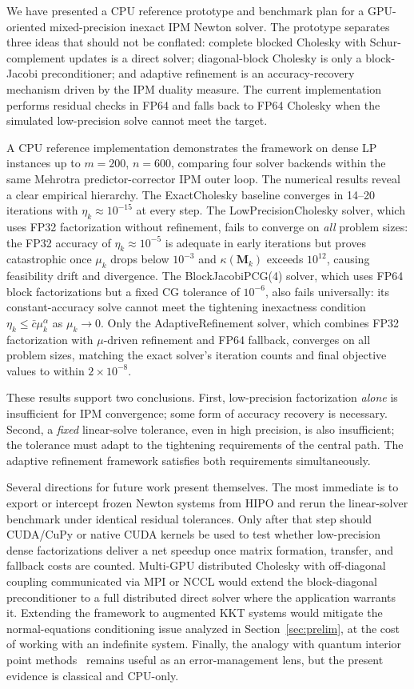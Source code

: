 \documentclass[11pt,twoside]{article}
\newcommand{\bM}{\mathbf{M}}
\begin{document}
We have presented a CPU reference prototype and benchmark plan for a
GPU-oriented mixed-precision inexact IPM Newton solver.  The prototype
separates three ideas that should not be conflated: complete blocked
Cholesky with Schur-complement updates is a direct solver; diagonal-block
Cholesky is only a block-Jacobi preconditioner; and adaptive refinement is
an accuracy-recovery mechanism driven by the IPM duality measure.  The
current implementation performs residual checks in FP64 and falls back to
FP64 Cholesky when the simulated low-precision solve cannot meet the
target.

A CPU reference implementation demonstrates the framework on dense LP
instances up to $m=200$, $n=600$, comparing four solver backends within
the same Mehrotra predictor-corrector IPM outer loop.  The numerical
results reveal a clear empirical hierarchy.  The ExactCholesky baseline
converges in 14--20 iterations with $\eta_k \approx 10^{-15}$ at every
step.  The LowPrecisionCholesky solver, which uses FP32 factorization
without refinement, fails to converge on \emph{all} problem sizes: the
FP32 accuracy of $\eta_k \approx 10^{-5}$ is adequate in early iterations
but proves catastrophic once $\mu_k$ drops below $10^{-3}$ and
$\kappa(\bM_k)$ exceeds $10^{12}$, causing feasibility drift and
divergence.  The BlockJacobiPCG(4) solver, which uses FP64 block
factorizations but a fixed CG tolerance of $10^{-6}$, also fails
universally: its constant-accuracy solve cannot meet the tightening
inexactness condition $\eta_k \le \bar{c}\mu_k^\alpha$ as $\mu_k \to 0$.
Only the AdaptiveRefinement solver, which combines FP32 factorization
with $\mu$-driven refinement and FP64 fallback, converges on all problem
sizes, matching the exact solver's iteration counts and final objective
values to within $2\times 10^{-8}$.

These results support two conclusions.  First, low-precision
factorization \emph{alone} is insufficient for IPM convergence; some form
of accuracy recovery is necessary.  Second, a \emph{fixed} linear-solve
tolerance, even in high precision, is also insufficient; the tolerance
must adapt to the tightening requirements of the central path.  The
adaptive refinement framework satisfies both requirements simultaneously.

Several directions for future work present themselves.  The most immediate
is to export or intercept frozen Newton systems from HIPO and rerun the
linear-solver benchmark under identical residual tolerances.  Only after
that step should CUDA/CuPy or native CUDA kernels be used to test whether
low-precision dense factorizations deliver a net speedup once matrix
formation, transfer, and fallback costs are counted.  Multi-GPU
distributed Cholesky with off-diagonal coupling communicated via MPI or
NCCL would extend the block-diagonal preconditioner to a full distributed
direct solver where the application warrants it.  Extending the framework
to augmented KKT systems would mitigate the normal-equations conditioning
issue analyzed in Section~\ref{sec:prelim}, at the cost of working with an
indefinite system.  Finally, the analogy with quantum interior point
methods~\cite{Kerenidis2020} remains useful as an error-management lens,
but the present evidence is classical and CPU-only.



\end{document}
